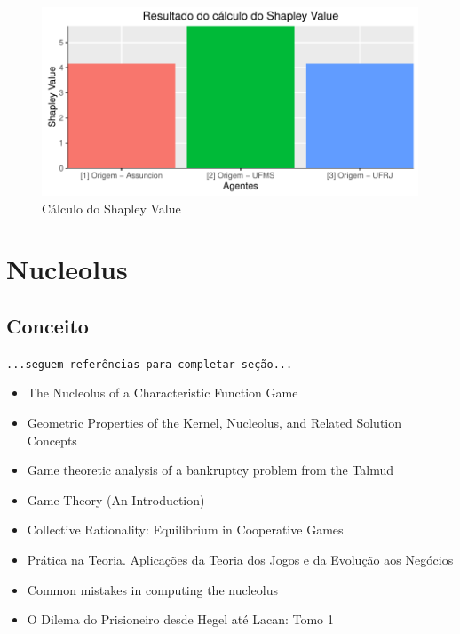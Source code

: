 \documentclass[
	article,			        %
	11pt,				          %
	oneside,			        %
	a4paper,			        %
	english,			        %
	brazil,				        %
	sumario=tradicional
]{abntex2}\usepackage[]{graphicx}\usepackage[]{color}
\makeatletter
\def\maxwidth{ %
  \ifdim\Gin@nat@width>\linewidth
    \linewidth
  \else
    \Gin@nat@width
  \fi
}
\newenvironment{knitrout}{}{} %
\makeatother
\begin{document}
\begin{knitrout}
\color{fgcolor}\begin{figure}[H]

{\centering \includegraphics[width=\maxwidth]{figure/unnamed-chunk-4-1} 

}

\caption[Cálculo do Shapley Value]{Cálculo do Shapley Value}\label{fig:unnamed-chunk-4}
\end{figure}


\end{knitrout}

\section{Nucleolus}

\subsection{Conceito}

  \texttt{\color{red}...seguem referências para completar seção...}
  \begin{itemize}
    \item The Nucleolus of a Characteristic Function Game \cite{Schmeidler.1969}
    \item Geometric Properties of the Kernel, Nucleolus, and Related Solution Concepts \cite{Maschler.1979}
    \item Game theoretic analysis of a bankruptcy problem from the Talmud \cite{Aumann.1985}
    \item Game Theory (An Introduction) \cite[p.~219--307]{Barron.2007}
    \item Collective Rationality: Equilibrium in Cooperative Games \cite{Weirich.2009}
    \item Prática na Teoria. Aplicações da Teoria dos Jogos e da Evolução aos Negócios \cite{Marinho.2011}
    \item Common mistakes in computing the nucleolus \cite{Guajardo.2015}
    \item O Dilema do Prisioneiro desde Hegel até Lacan: Tomo 1 \cite{Faveret.2015}
  \end{itemize}
\end{document}
